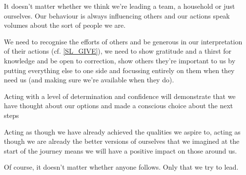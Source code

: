 \cleardoublepage
\begin{multicols}{2}

It doesn't matter whether we think we're leading a team, a household or just ourselves. Our behaviour is always influencing others and our actions speak volumes about the sort of people we are. 

We need to recognise the efforts of others and be generous in our interpretation of their actions (cf. \ref{SL_GIVE}), we need to show gratitude and a thirst for knowledge and be open to correction, show others they're important to us by putting everything else to one side and focussing entirely on them when they need us (and making sure we're available when they do). 

Acting with a level of determination and confidence will demonstrate that we have thought about our options and made a conscious choice about the next steps

Acting as though we have already achieved the qualities we aspire to, acting as though we are already the better versions of ourselves that we imagined at the start of the journey means we will have a positive impact on those around us.

Of course, it doesn't matter whether anyone follows. Only that we try to lead.

\end{multicols}
\clearpage

